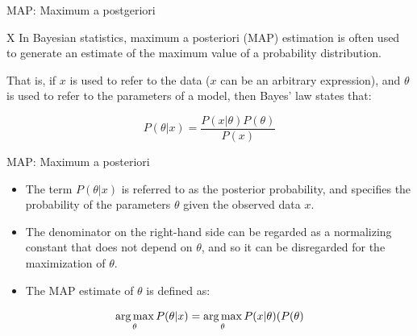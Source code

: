 \documentclass{beamer}
\newcommand{\argmax}{\operatornamewithlimits{arg\,max}}
\begin{document}
\begin{frame}{MAP: Maximum a postgeriori}
 \begin{mybluebox}{X}
   In Bayesian statistics, maximum a posteriori (MAP) estimation is often
used to generate an estimate of the maximum value of a probability
distribution. 
 \end{mybluebox}

That is, if $x$ is used to refer to the data ($x$ can be
an arbitrary expression), and $\theta$ is used to refer to the
parameters of a model, then Bayes' law states that:

\begin{equation}
P(\theta | x) = \dfrac{P(x|\theta )P(\theta )}{P(x)}
\label{eq:bayes-law-for-map}
\end{equation}
 
\end{frame}


\begin{frame}{MAP: Maximum a posteriori}
 \begin{itemize}
  \item The term $P(\theta | x)$ is referred to as the posterior probability,
and specifies the probability of the parameters $\theta$ given the
observed data $x$. 
\item The denominator on the right-hand side can be
regarded as a normalizing constant that does not depend on $\theta$,
and so it can be disregarded for the maximization of $\theta$. 
\item The MAP
estimate of $\theta$ is defined as:
 \end{itemize}


\begin{equation}
\argmax_{\theta} P(\theta | x) = \argmax_{\theta} P(x|\theta )(P(\theta )
\label{eq:map}
\end{equation}
 
 
\end{frame}
\end{document}
